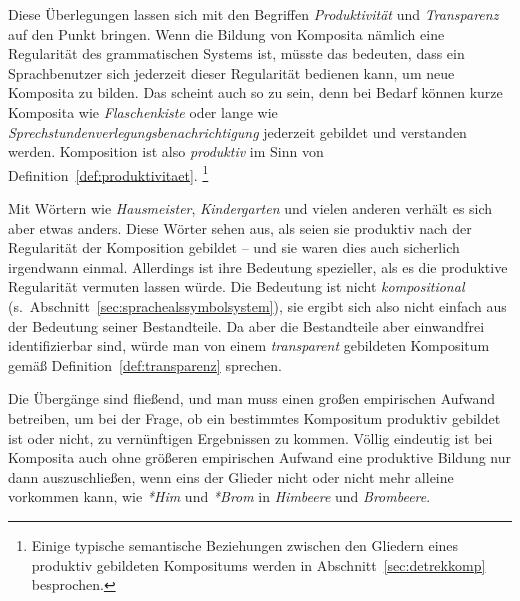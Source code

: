 Diese Überlegungen lassen sich mit den Begriffen \textit{Produktivität} und \textit{Transparenz} auf den Punkt bringen.
Wenn die Bildung von Komposita nämlich eine Regularität des grammatischen Systems ist, müsste das bedeuten, dass ein Sprachbenutzer sich jederzeit dieser Regularität bedienen kann, um neue Komposita zu bilden.
Das scheint auch so zu sein, denn bei Bedarf können kurze Komposita wie \textit{Flaschenkiste} oder lange wie \textit{Sprechstundenverlegungsbenachrichtigung} jederzeit gebildet und verstanden werden.
Komposition ist also \textit{produktiv} im Sinn von Definition~\ref{def:produktivitaet}.%
\footnote{Einige typische semantische Beziehungen zwischen den Gliedern eines produktiv gebildeten Kompositums werden in Abschnitt~\ref{sec:detrekkomp} besprochen.}


Mit Wörtern wie \textit{Hausmeister}, \textit{Kindergarten} und vielen anderen verhält es sich aber etwas anders.
Diese Wörter sehen aus, als seien sie produktiv nach der Regularität der Komposition gebildet -- und sie waren dies auch sicherlich irgendwann einmal.
Allerdings ist ihre Bedeutung spezieller, als es die produktive Regularität vermuten lassen würde.
Die Bedeutung ist nicht \textit{kompositional} (s.\ Abschnitt~\ref{sec:sprachealssymbolsystem}), sie ergibt sich also nicht einfach aus der Bedeutung seiner Bestandteile.
Da aber die Bestandteile aber einwandfrei identifizierbar sind, würde man von einem \textit{transparent} gebildeten Kompositum gemäß Definition~\ref{def:transparenz} sprechen.


Die Übergänge sind fließend, und man muss einen großen empirischen Aufwand betreiben, um bei der Frage, ob ein bestimmtes Kompositum produktiv gebildet ist oder nicht, zu vernünftigen Ergebnissen zu kommen.
Völlig eindeutig ist bei Komposita auch ohne größeren empirischen Aufwand eine produktive Bildung nur dann auszuschließen, wenn eins der Glieder nicht oder nicht mehr alleine vorkommen kann, wie \textit{*Him} und \textit{*Brom} in \textit{Himbeere} und \textit{Brombeere}.

